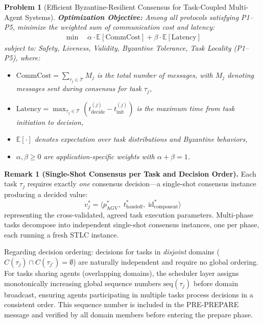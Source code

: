 \documentclass[manuscript,screen,review]{acmart}
\newtheorem{problem}{Problem}
\begin{document}
\begin{problem}[Efficient Byzantine-Resilient Consensus for Task-Coupled Multi-Agent Systems]
\vspace{0.3cm}
\noindent \textbf{Optimization Objective:} Among all protocols satisfying P1--P5, minimize the weighted sum of communication cost and latency:
\begin{equation}
\begin{aligned}
\min \quad \alpha \cdot \mathbb{E}[\text{CommCost}] +
\beta \cdot \mathbb{E}[\text{Latency}]
\label{eq:objective}
\end{aligned}
\end{equation}
subject to: Safety, Liveness, Validity, Byzantine Tolerance, Task Locality (P1--P5), where:
\begin{itemize}
    \item $\text{CommCost} = \sum_{\tau_j \in \mathcal{T}} M_j$ is the total number of messages, with $M_j$ denoting messages sent during consensus for task $\tau_j$,
    \item $\text{Latency} = \max_{\tau_j \in \mathcal{T}} (t_{\text{decide}}^{(j)} - t_{\text{init}}^{(j)})$ is the maximum time from task initiation to decision,
    \item $\mathbb{E}[\cdot]$ denotes expectation over task distributions and Byzantine behaviors,
    \item $\alpha, \beta \geq 0$ are application-specific weights with $\alpha + \beta = 1$.
\end{itemize}
\end{problem}

\vspace{0.3cm}
\noindent \textbf{Remark 1 (Single-Shot Consensus per Task and Decision Order).}
\label{rem:ordering}
Each task $\tau_j$ requires exactly \emph{one} consensus decision---a single-shot consensus instance producing a decided value:
\[
  v_j^* = \langle p^*_{\text{AGV}},\; t^*_{\text{handoff}},\; \text{id}^*_{\text{component}} \rangle
\]
representing the cross-validated, agreed task execution parameters. Multi-phase tasks decompose into independent single-shot consensus instances, one per phase, each running a fresh STLC instance.

Regarding decision ordering: decisions for tasks in \emph{disjoint} domains ($C(\tau_j) \cap C(\tau_{j'}) = \emptyset$) are naturally independent and require no global ordering. For tasks sharing agents (overlapping domains), the scheduler layer assigns monotonically increasing global sequence numbers $\text{seq}(\tau_j)$ before domain broadcast, ensuring agents participating in multiple tasks process decisions in a consistent order. This sequence number is included in the PRE-PREPARE message and verified by all domain members before entering the prepare phase.
\end{document}
